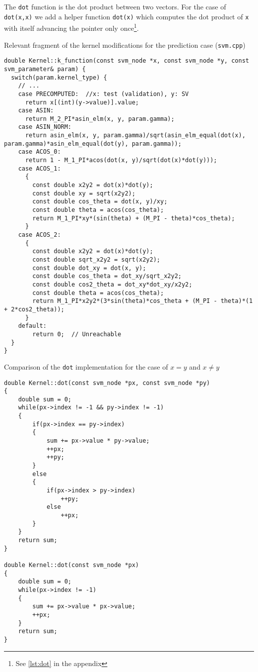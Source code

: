 The \texttt{dot} function is the dot product between two vectors. For the case
of \texttt{dot(x,x)} we add a helper function \texttt{dot(x)}
which computes the dot product of \texttt{x} with itself advancing the pointer
only once\footnote{See \cref{lst:dot} in the appendix}.

\begin{listing}
    \caption{Relevant fragment of the kernel modifications for the prediction case (\texttt{svm.cpp})}
    \label{lst:svm_cpp_k_function}
    \begin{verbatim}
double Kernel::k_function(const svm_node *x, const svm_node *y, const svm_parameter& param) {
  switch(param.kernel_type) {
    // ...
    case PRECOMPUTED:  //x: test (validation), y: SV
      return x[(int)(y->value)].value;
    case ASIN:
      return M_2_PI*asin_elm(x, y, param.gamma);
    case ASIN_NORM:
      return asin_elm(x, y, param.gamma)/sqrt(asin_elm_equal(dot(x), param.gamma)*asin_elm_equal(dot(y), param.gamma));
    case ACOS_0:
      return 1 - M_1_PI*acos(dot(x, y)/sqrt(dot(x)*dot(y)));
    case ACOS_1:
      {
        const double x2y2 = dot(x)*dot(y);
        const double xy = sqrt(x2y2);
        const double cos_theta = dot(x, y)/xy;
        const double theta = acos(cos_theta);
        return M_1_PI*xy*(sin(theta) + (M_PI - theta)*cos_theta);
      }
    case ACOS_2:
      {
        const double x2y2 = dot(x)*dot(y);
        const double sqrt_x2y2 = sqrt(x2y2);
        const double dot_xy = dot(x, y);
        const double cos_theta = dot_xy/sqrt_x2y2;
        const double cos2_theta = dot_xy*dot_xy/x2y2;
        const double theta = acos(cos_theta);
        return M_1_PI*x2y2*(3*sin(theta)*cos_theta + (M_PI - theta)*(1 + 2*cos2_theta));
      }
    default:
        return 0;  // Unreachable
  }
}
\end{verbatim}
\end{listing}

\begin{listing}
    \caption{Comparison of the \texttt{dot} implementation for the case of $x = y$ and $x \neq y$}
    \label{lst:dot}
    \begin{verbatim}
double Kernel::dot(const svm_node *px, const svm_node *py)
{
	double sum = 0;
	while(px->index != -1 && py->index != -1)
	{
		if(px->index == py->index)
		{
			sum += px->value * py->value;
			++px;
			++py;
		}
		else
		{
			if(px->index > py->index)
				++py;
			else
				++px;
		}
	}
	return sum;
}

double Kernel::dot(const svm_node *px)
{
	double sum = 0;
	while(px->index != -1)
	{
		sum += px->value * px->value;
		++px;
	}
	return sum;
}
\end{verbatim}
\end{listing}
